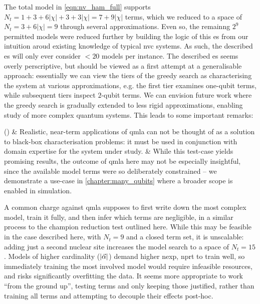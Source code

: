 The total model in \cref{eqn:nv_ham_full} supports $N_t = 1 + 3 + 6 | \chi | + 3 + 3 |\chi| = 7 + 9|\chi| $ terms, 
    which we reduced to a space of $N_t=3 + 6 |\chi| = 9$ through several approximations\footnotemark.
Even so, the remainng $2^9$ permitted models were reduced further by building the logic of this \gls{es} 
    from our intuition aroud existing knowledge of typical \gls{nvc} systems.
As such, the described \gls{es} will only ever consider $<20$ models per instance. 
The described \gls{es} seems overly perscriptive, 
    but should be viewed as a first attempt at a generalisable approach: 
    essentially we can view the tiers of the greedy search as characterising the system 
    at various approximations, 
    e.g. the first tier examines one-qubit terms, while subsequent tiers inspect $2$-qubit terms. 
We can envision future work where the greedy search is gradually extended to less rigid approximations, 
    enabling study of more complex quantum systems.     
This leads to some important remarks:

\begin{easylist}[enumerate]
    \ListProperties()
    & Realistic, near-term applications of \gls{qmla} can not be thought of as a solution to black-box characterisation problems: 
        it must be used in conjunction with domain expertise for the system under study.
    & While this test-case yields promising results, the outcome of \gls{qmla} here may not be especially insightful, 
        since the available model terms were so deliberately constrained -- we demonstrate a use-case in \cref{chapter:many_qubits} 
        where a broader scope is enabled in simulation.    
\end{easylist}   
\par 

A common charge against \gls{qmla} supposes to first write down the most complex model, 
    train it fully, and then infer which terms are negligible, in a similar process to the champion reduction test outlined here. 
While this may be feasible in the case described here, with $N_t=9$ and a closed term set, 
    it is unscalable: adding just a second nuclear site increases the \gls{model search} to a space of $N_t=15$.
Models of higher cardinality ($|\vec{\alpha}|$) demand higher \gls{nexp}, \gls{nprt} to train well, so immediately training the most involved model would 
    require infeasible resources\footnotemark, and risks significantly overfitting the data. 
It seems more appropriate to work ``from the ground up'', testing terms and only keeping those justified, 
    rather than training all terms and attempting to decouple their effects post-hoc. 

